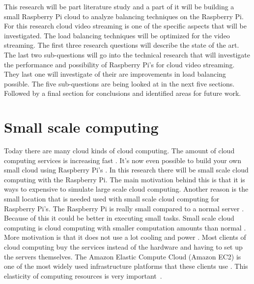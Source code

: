 \documentclass{sig-alternate-br}
\begin{document}
This research will be part literature study and a part of it will be building a small Raspberry Pi cloud to analyze balancing techniques on the Raspberry Pi. For this research cloud video streaming is one of the specific aspects that will be investigated. The load balancing techniques will be optimized for the video streaming. The first three research questions will describe the state of the art. 
The last two sub-questions will go into the technical research that will investigate the performance and possibility of Raspberry Pi's for cloud video streaming. They last one will investigate of their are improvements in load balancing possible. The five sub-questions are being looked at in the next five sections. Followed by a final section for conclusions and identified areas for future
work.


\section{Small scale computing}
Today there are many cloud kinds of cloud computing. The amount of cloud computing services is increasing fast \cite{armbrust:2009}. It's now even possible to build your own small cloud using Raspberry Pi's \cite{southampton,abrahamsson:2013}. In this research there will be small scale cloud computing with the Raspberry Pi. The main motivation behind this is that it is ways to expensive to simulate large scale cloud computing. Another reason is the small location that is needed used with small scale cloud computing for Raspberry Pi's\cite{Pcextreme}. The Raspberry Pi is really small compared to a normal server \cite{cox:2014}. Because of this it could be better in executing small tasks. Small scale cloud computing is cloud computing with smaller computation amounts than normal \cite{cox:2014}. More motivation is that it does not use a lot cooling and power \cite{tso:2013}.  Most clients of cloud computing buy the services instead of the hardware and having to set up the servers themselves. 
The Amazon Elastic Compute Cloud (Amazon EC2) is one of the most widely used infrastructure platforms that these clients use \cite{hofer:2011}. This elasticity of computing resources is very important~\cite{Miettinen:2010:EEM:1863103.1863107}. 
\end{document}
